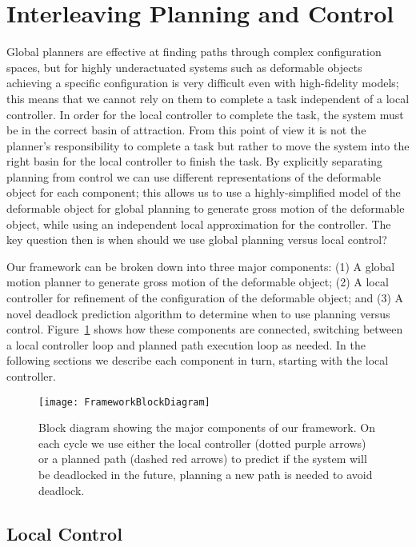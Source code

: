 \section{Interleaving Planning and Control}
\label{sec:main_framework_loop}

Global planners are effective at finding paths through complex configuration spaces, but for highly underactuated systems such as deformable objects achieving a specific configuration is very difficult even with high-fidelity models; this means that we cannot rely on them to complete a task independent of a local controller. In order for the local controller to complete the task, the system must be in the correct basin of attraction. From this point of view it is not the planner's responsibility to complete a task but rather to move the system into the right basin for the local controller to finish the task. By explicitly separating planning from control we can use different representations of the deformable object for each component; this allows us to use a highly-simplified model of the deformable object for global planning to generate gross motion of the deformable object, while using an independent local approximation for the controller. The key question then is when should we use global planning versus local control?

Our framework can be broken down into three major components: (1) A global motion planner to generate gross motion of the deformable object; (2) A local controller for refinement of the configuration of the deformable object; and (3) A novel deadlock prediction algorithm to determine when to use planning versus control. Figure~\ref{fig:main_loop_diagram} shows how these components are connected, switching between a local controller loop and planned path execution loop as needed. In the following sections we describe each component in turn, starting with the local controller.

\begin{figure}[h]
    \centering
    \texttt{[image: FrameworkBlockDiagram]}
    \caption{Block diagram showing the major components of our framework. On each cycle we use either the local controller (dotted purple arrows) or a planned path (dashed red arrows) to predict if the system will be deadlocked in the future, planning a new path is needed to avoid deadlock.}
    \label{fig:main_loop_diagram}
\end{figure}


\subsection{Local Control}
\label{sec:local_control}

